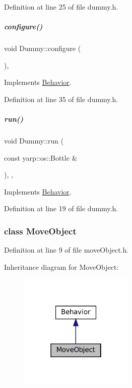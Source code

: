 Definition at line 25 of file dummy.\+h.

\mbox{\label{group__behaviorManager_a493f3a2d8faa22b3175946e13b8dfe88}} 
\subparagraph{\texorpdfstring{configure()}{configure()}}
{\footnotesize\ttfamily void Dummy\+::configure (\begin{DoxyParamCaption}{ }\end{DoxyParamCaption})\hspace{0.3cm}{\ttfamily [inline]}, {\ttfamily [virtual]}}



Implements \hyperlink{group__behaviorManager_a30484d4d6de3c0689de4f60da3efbab8}{Behavior}.



Definition at line 35 of file dummy.\+h.

\mbox{\label{group__behaviorManager_a49b398f1050441b1a2f63da63420a6f1}} 
\subparagraph{\texorpdfstring{run()}{run()}}
{\footnotesize\ttfamily void Dummy\+::run (\begin{DoxyParamCaption}\item[{const yarp\+::os\+::\+Bottle \&}]{ }\end{DoxyParamCaption})\hspace{0.3cm}{\ttfamily [inline]}, {\ttfamily [protected]}, {\ttfamily [virtual]}}



Implements \hyperlink{group__behaviorManager_a7dfd81b30f9ddf1864093626650751c3}{Behavior}.



Definition at line 19 of file dummy.\+h.

\label{classMoveObject}
\subsubsection{class Move\+Object}


Definition at line 9 of file move\+Object.\+h.



Inheritance diagram for Move\+Object\+:
\nopagebreak
\begin{figure}[H]
\begin{center}
\leavevmode
\includegraphics[width=154pt]{classMoveObject__inherit__graph}
\end{center}
\end{figure}

